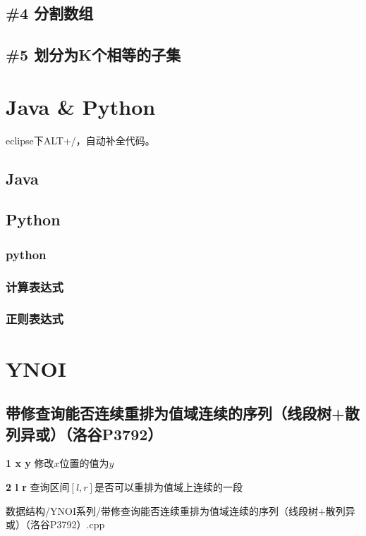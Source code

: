 \documentclass[twoside,a4paper]{article}
\begin{document}
\subsection{\#4 分割数组}


\subsection{\#5 划分为K个相等的子集}



\section{Java \& Python}
eclipse下ALT+/，自动补全代码。

\subsection{Java}



\subsection{Python}
\subsubsection{python}

\subsubsection{计算表达式}

\subsubsection{正则表达式}



\section{YNOI}
\subsection{带修查询能否连续重排为值域连续的序列（线段树+散列异或）（洛谷P3792）}
\textbf{1 x y} 修改$x$位置的值为$y$\par
\textbf{2 l r} 查询区间$[l,r]$是否可以重排为值域上连续的一段\par
 {数据结构/YNOI系列/带修查询能否连续重排为值域连续的序列（线段树+散列异或）（洛谷P3792）.cpp}
\end{document}
